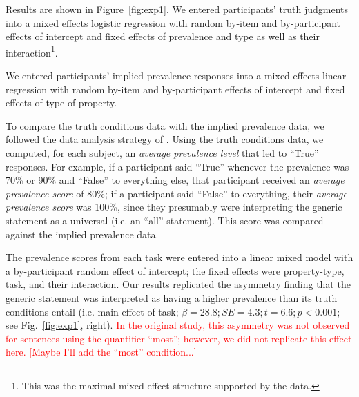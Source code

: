 \documentclass[10pt,letterpaper]{article}
\newcommand{\red}[1]{\textcolor{Red}{#1}}
\begin{document}
Results are shown in Figure~\ref{fig:exp1}. We entered participants' truth judgments into a mixed effects logistic regression with random by-item and by-participant effects of intercept and fixed effects of prevalence and type as well as their interaction\footnote{This was the maximal mixed-effect structure supported by the data.}.  
%

We entered participants' implied prevalence responses into a mixed effects linear regression with random by-item and by-participant effects of intercept and fixed effects of type of property.

To compare the truth conditions data with the implied prevalence data, we followed the data analysis strategy of \citeauthor{Cimpian2010}. Using the truth conditions data, we computed, for each subject, an \emph{average prevalence level} that led to ``True'' responses. For example, if a participant said ``True'' whenever the prevalence was 70\% or 90\% and ``False'' to everything else, that participant received an \emph{average prevalence score} of 80\%; if a participant said ``False'' to everything, their \emph{average prevalence score} was 100\%, since they presumably were interpreting the generic statement as a universal (i.e. an ``all'' statement). This score was compared against the implied prevalence data.

The prevalence scores from each task were entered into a linear mixed model with a by-participant random effect of intercept; the fixed effects were property-type, task, and their interaction. Our results replicated the asymmetry finding that the generic statement was interpreted as having a higher prevalence than its truth conditions entail (i.e. main effect of task; $\beta=28.8; SE = 4.3; t=6.6; p < 0.001$; see Fig.~\ref{fig:exp1}, right). \red{In the original study, this asymmetry was not observed for sentences using the quantifier ``most''; however, we did not replicate this effect here. [Maybe I'll add the ``most'' condition...]}
\end{document}

